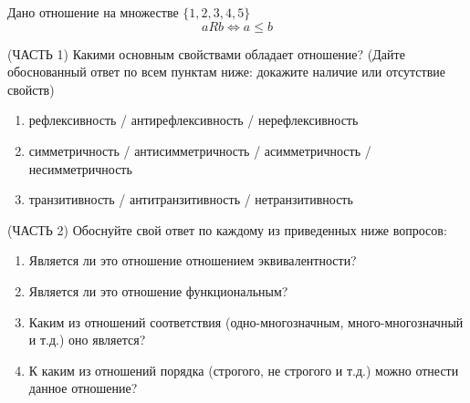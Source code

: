 \question
Дано отношение на множестве $\{1, 2, 3, 4, 5\}$ 
\begin{equation*}
	aRb \iff a \leqslant b
\end{equation*}

(ЧАСТЬ 1) Какими основным свойствами обладает отношение? (Дайте обоснованный ответ по всем пунктам ниже: докажите наличие или отсутствие свойств)  
\begin{enumerate}
	\renewcommand{\labelenumi}{\alph{enumi})}
	\item рефлексивность / антирефлексивность / нерефлексивность
	\item симметричность / антисимметричность / асимметричность / несимметричность
	\item транзитивность / антитранзитивность / нетранзитивность
\end{enumerate}

(ЧАСТЬ 2) Обоснуйте свой ответ по каждому из приведенных ниже вопросов:
\begin{enumerate}
	\renewcommand{\labelenumi}{\alph{enumi})}
    \item Является ли это отношение отношением эквивалентности?
    \item Является ли это отношение функциональным?
    \item Каким из отношений соответствия (одно-многозначным, много-многозначный и т.д.) оно является?
    \item К каким из отношений порядка (строгого, не строгого и т.д.) можно отнести данное отношение?
\end{enumerate}
